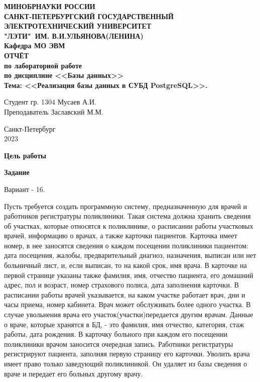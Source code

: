 \documentclass{article}
\date{\today}
\begin{document}
\thispagestyle{empty}
\begin{center}
    \LARGE\textbf{МИНОБРНАУКИ РОССИИ\\
        САНКТ-ПЕТЕРБУРГСКИЙ ГОСУДАРСТВЕННЫЙ\\
        ЭЛЕКТРОТЕХНИЧЕСКИЙ УНИВЕРСИТЕТ\\
        "ЛЭТИ"\ ИМ. В.И.УЛЬЯНОВА(ЛЕНИНА)\\
        Кафедра МО ЭВМ}\\[4cm]
    \Large\textbf{ОТЧЁТ}\\[0.2cm]
    \Large\textbf{по лабораторной работе}\\[0.1cm]
    \Large\textbf{по дисциплине <<Базы данных>>}\\[0.1cm]
    \Large\textbf{Тема: <<Реализация базы данных в СУБД PostgreSQL>>.}\\[3cm]
\end{center}
\Large{Студент гр. 1304 \qquad \qquad \quad \underline{\hspace{6cm}} \qquad \qquad Мусаев А.И.}\\[0.5cm]
\Large{Преподаватель \qquad \qquad \qquad \underline{\hspace{6cm}} \qquad \qquad Заславский М.М.}\\[3.5cm]
\begin{center}
    Санкт-Петербург\\
    2023
\end{center}
\newpage

\textbf{Цель работы}

\textbf{Задание}

Вариант - 16.

Пусть требуется создать программную систему, предназначенную для врачей и работников регистратуры поликлиники. Такая система должна хранить сведения об участках, которые относятся к поликлинике, о расписании работы участковых врачей, информацию о врачах, а также карточки пациентов. Карточка имеет номер, в нее заносятся сведения о каждом посещении поликлиники пациентом: дата посещения, жалобы, предварительный диагноз, назначения, выписан или нет больничный лист, и, если выписан, то на какой срок, имя врача. В карточке на первой странице указаны также фамилия, имя, отчество пациента, его домашний адрес, пол и возраст, номер страхового полиса, дата заполнения карточки. В расписании работы врачей указывается, на каком участке работает врач, дни и часы приема, номер кабинета. Врач может обслуживать более одного участка. В случае увольнения врача его участок(участки)передается другим врачам. Данные о враче, которые хранятся в БД, - это фамилия, имя отчество, категория, стаж работы, дата рождения. В карточку больного при каждом его посещении поликлиники врачом заносится очередная запись. Работники регистратуры регистрируют пациента, заполняя первую страницу его карточки. Уволить врача имеет право только заведующий поликлиникой. Он удаляет из базы сведения о враче и передает его больных другому врачу.
\end{document}
